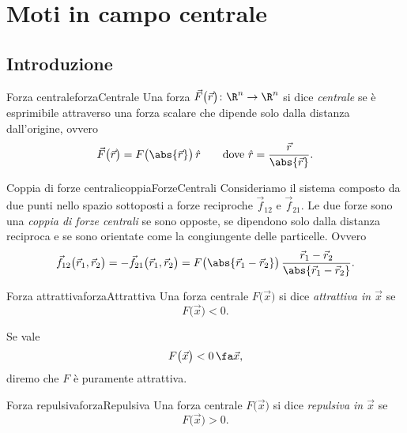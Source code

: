 %
%
\chapter{Moti in campo centrale}
\section{Introduzione}
\begin{defn}{Forza centrale}{forzaCentrale}
	Una forza \(\vec{F}\big(\vec{r}\big)\colon \R^n \to \R^n\) si dice \emph{centrale} se è esprimibile attraverso una forza scalare che dipende solo dalla distanza dall'origine, ovvero
	\[
		\vec{F}\big(\vec{r}\big) = F\big(\abs{\vec{r}}\big)\,\hat{r} \qquad\text{dove }\hat{r} = \frac{\vec{r}}{\abs{\vec{r}}}.
	\]
\end{defn}

\begin{defn}{Coppia di forze centrali}{coppiaForzeCentrali}
	Consideriamo il sistema composto da due punti nello spazio sottoposti a forze reciproche \(\vec{f}_{12}\) e \(\vec{f}_{21}\).
	Le due forze sono una \emph{coppia di forze centrali} se sono opposte, se dipendono solo dalla distanza reciproca e se sono orientate come la congiungente delle particelle. Ovvero
	\[
		\vec{f}_{12}\big(\vec{r}_1,\vec{r}_2\big) = -\vec{f}_{21}\big(\vec{r}_1,\vec{r}_2\big) = F\big(\abs{\vec{r}_1-\vec{r}_2}\big)\,\frac{\vec{r}_1-\vec{r}_2}{\abs{\vec{r}_1-\vec{r}_2}}.
	\]
\end{defn}

\begin{defn}{Forza attrattiva}{forzaAttrattiva}
	Una forza centrale \(F\big(\vec{x}\big)\) si dice \emph{attrattiva in \(\vec{x}\)} se
	\[
		F\big(\vec{x}\big) < 0.
	\]
\end{defn}

\begin{notz}
	Se vale
	\[
		F\big(\vec{x}\big) < 0 \,\fa \vec{x},
	\]
	diremo che \(F\) è puramente attrattiva.
\end{notz}

\begin{defn}{Forza repulsiva}{forzaRepulsiva}
	Una forza centrale \(F\big(\vec{x}\big)\) si dice \emph{repulsiva in \(\vec{x}\)} se
	\[
		F\big(\vec{x}\big) > 0.
	\]
\end{defn}

